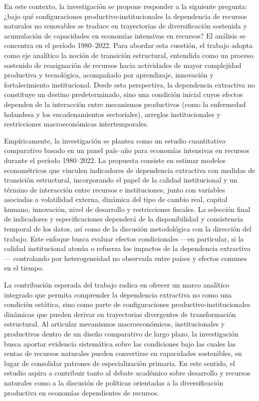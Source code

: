 \documentclass[12pt,a4paper]{article}
\begin{document}
	En este contexto, la investigación se propone responder a la siguiente pregunta: ¿bajo qué configuraciones productivo-institucionales la dependencia de recursos naturales no renovables se traduce en trayectorias de diversificación sostenida y acumulación de capacidades en economías intensivas en recursos? El análisis se concentra en el período 1980–2022. Para abordar esta cuestión, el trabajo adopta como eje analítico la noción de transición estructural, entendida como un proceso sostenido de reasignación de recursos hacia actividades de mayor complejidad productiva y tecnológica, acompañado por aprendizaje, innovación y fortalecimiento institucional. Desde esta perspectiva, la dependencia extractiva no constituye un destino predeterminado, sino una condición inicial cuyos efectos dependen de la interacción entre mecanismos productivos (como la enfermedad holandesa y los encadenamientos sectoriales), arreglos institucionales y restricciones macroeconómicas intertemporales.
	
	Empíricamente, la investigación se plantea como un estudio cuantitativo comparativo basado en un panel país–año para economías intensivas en recursos durante el período 1980–2022. La propuesta consiste en estimar modelos econométricos que vinculen indicadores de dependencia extractiva con medidas de transición estructural, incorporando el papel de la calidad institucional y un término de interacción entre recursos e instituciones, junto con variables asociadas a volatilidad externa, dinámica del tipo de cambio real, capital humano, innovación, nivel de desarrollo y restricciones fiscales. La selección final de indicadores y especificaciones dependerá de la disponibilidad y consistencia temporal de los datos, así como de la discusión metodológica con la dirección del trabajo. Este enfoque busca evaluar efectos condicionales —en particular, si la calidad institucional atenúa o refuerza los impactos de la dependencia extractiva— controlando por heterogeneidad no observada entre países y efectos comunes en el tiempo.
	
	La contribución esperada del trabajo radica en ofrecer un marco analítico integrado que permita comprender la dependencia extractiva no como una condición estática, sino como parte de configuraciones productivo-institucionales dinámicas que pueden derivar en trayectorias divergentes de transformación estructural. Al articular mecanismos macroeconómicos, institucionales y productivos dentro de un diseño comparativo de largo plazo, la investigación busca aportar evidencia sistemática sobre las condiciones bajo las cuales las rentas de recursos naturales pueden convertirse en capacidades sostenibles, en lugar de consolidar patrones de especialización primaria. En este sentido, el estudio aspira a contribuir tanto al debate académico sobre desarrollo y recursos naturales como a la discusión de políticas orientadas a la diversificación productiva en economías dependientes de recursos.
	
\end{document}
